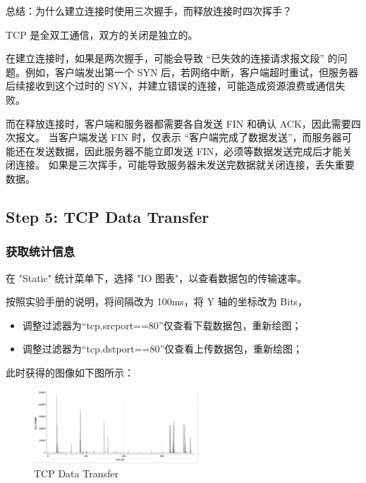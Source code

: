 \documentclass[14pt,a4paper,UTF8,twoside]{article}
\begin{document}
\begin{rmr}
	总结：为什么建立连接时使用三次握手，而释放连接时四次挥手？

	\vspace{0.5cm}

	TCP 是全双工通信，双方的关闭是独立的。

	\vspace{0.5cm}

	在建立连接时，如果是两次握手，可能会导致 “已失效的连接请求报文段” 的问题。例如，客户端发出第一个 SYN 后，若网络中断，客户端超时重试，但服务器后续接收到这个过时的 SYN，并建立错误的连接，可能造成资源浪费或通信失败。

	\vspace{0.5cm}

	而在释放连接时，客户端和服务器都需要各自发送 FIN 和确认 ACK，因此需要四次报文。
	当客户端发送 FIN 时，仅表示 “客户端完成了数据发送”，而服务器可能还在发送数据，因此服务器不能立即发送 FIN，必须等数据发送完成后才能关闭连接。
	如果是三次挥手，可能导致服务器未发送完数据就关闭连接，丢失重要数据。
\end{rmr}


\subsection{Step 5: TCP Data Transfer}

\subsubsection{获取统计信息}

在 "Static" 统计菜单下，选择 "IO 图表"，以查看数据包的传输速率。

按照实验手册的说明，将间隔改为 100ms，将 Y 轴的坐标改为 Bits，

\begin{itemize}
	\item 调整过滤器为“tcp.srcport==80”仅查看下载数据包，重新绘图；
	\item 调整过滤器为“tcp.dstport==80”仅查看上传数据包，重新绘图；	
\end{itemize}

此时获得的图像如下图所示：

\begin{figure}[H]
	\centering
	\includegraphics[width=0.55\textwidth]{lab6/result.png}
	\caption{TCP Data Transfer}
\end{figure}
\end{document}
